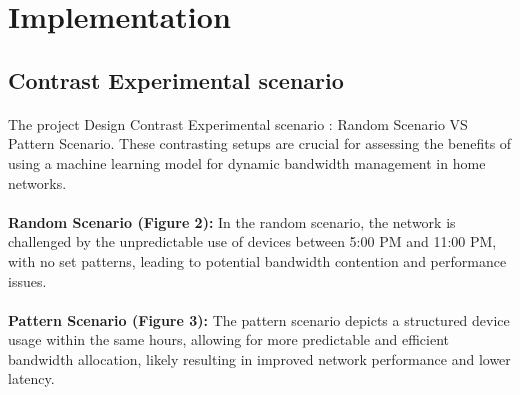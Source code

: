 \documentclass[10pt]{article}
\begin{document}
\section{Implementation}

\subsection{Contrast Experimental scenario}
\paragraph{}
The project Design Contrast Experimental scenario :  Random Scenario  VS  Pattern Scenario. These contrasting setups are crucial for assessing the benefits of using a machine learning model for dynamic bandwidth management in home networks.

\paragraph{}
\textbf{Random Scenario  (Figure 2):} 
In the random scenario, the network is challenged by the unpredictable use of devices between 5:00 PM and 11:00 PM, with no set patterns, leading to potential bandwidth contention and performance issues. 

\paragraph{}
\textbf{Pattern Scenario (Figure 3):}
The pattern scenario depicts a structured device usage within the same hours, allowing for more predictable and efficient bandwidth allocation, likely resulting in improved network performance and lower latency.  
\end{document}
